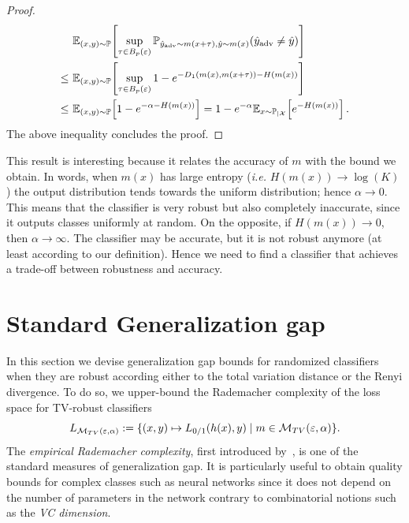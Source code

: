 \begin{proof}
\begin{align*}
&\mathbb{E}_{(x ,y) \sim \PP}\left[\sup_{ \perturb \in B_p(\varepsilon)}\mathbb{P}_{\hat{y}_{\text{adv}}\sim m (x +\perturb),\hat{y}\sim m (x )}(\hat{y}_{\text{adv}}\neq \hat{y})\right]\\
 \leq ~& \mathbb{E}_{(x ,y) \sim \PP}\left[\sup_{ \perturb \in B_p(\varepsilon)} 1-e^{- D_{1}(m (x ),m (x +\perturb))-H(m (x ))} \right]\\
\leq ~& \mathbb{E}_{(x ,y) \sim \PP}\left[1-e^{-\alpha-H(m (x ))} \right] = 1-e^{-\alpha}\mathbb{E}_{x  \sim \PP_{\mid \XX}}\left[e^{-H(m (x ))}\right]\equationspace.
\end{align*}
The above inequality concludes the proof.
\end{proof}

 
This result is interesting because it relates the accuracy of $m $ with the bound we obtain. 
In words, when $m (x )$ has large entropy (\emph{i.e.} $H(m (x ))\rightarrow \log(K)$) the output distribution tends towards the uniform distribution; hence $\alpha\rightarrow0$. This means that the classifier is very robust but also completely inaccurate, since it outputs classes uniformly at random.   
On the opposite, if $H(m (x ))\rightarrow 0$, then $\alpha\rightarrow\infty$. The classifier may be accurate, but it is not robust anymore (at least according to our definition). Hence we need to find a classifier that achieves a trade-off between robustness and accuracy. 

\section{Standard Generalization gap}
\label{section::GeneralizationBoundAdvGap} 

In this section we devise generalization gap bounds for randomized classifiers when they are robust according either to the total variation distance or the Renyi divergence. To do so, we upper-bound the Rademacher complexity of the loss space for TV-robust classifiers $$ \loss_{\mathcal{M}_{TV}\left(\varepsilon,\alpha\right)}:= \{ (x ,y) \mapsto \zerooneloss(\hypothesis(x ),y)  \mid m  \in \mathcal{M}_{TV}\left(\varepsilon,\alpha\right) \}. $$ The \emph{empirical Rademacher complexity}, first introduced by~\cite{bartlett2002rademacher}, is one of the standard measures of generalization gap. It is particularly useful to obtain quality bounds for complex classes such as neural networks since it does not depend on the number of parameters in the network contrary to combinatorial notions such as the \emph{VC dimension}.

